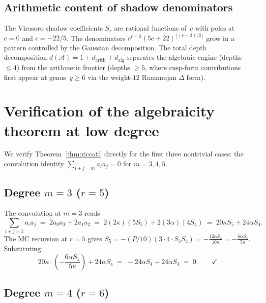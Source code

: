 \documentclass[11pt,reqno]{amsart}
\theoremstyle{definition}
\theoremstyle{remark}
\newcommand{\cA}{\mathcal{A}}
\numberwithin{equation}{section}
\begin{document}
\subsection{Arithmetic content of shadow
denominators}\label{subsec:outlook-arithmetic}

The Virasoro shadow coefficients $S_r$ are rational
functions of~$c$ with poles at $c = 0$ and $c = -22/5$.
The denominators
$c^{r-3}(5c+22)^{\lfloor(r-2)/2\rfloor}$ grow in a
pattern controlled by the Gaussian decomposition.
The total depth decomposition
$d(\cA) = 1 + d_{\mathrm{arith}} + d_{\mathrm{alg}}$
separates the algebraic engine (depths $\le 4$) from the
arithmetic frontier (depths $\ge 5$, where cusp-form
contributions first appear at genus~$g \ge 6$ via the
weight-$12$ Ramanujan $\Delta$ form).



\appendix

\section{Verification of the algebraicity theorem at low
degree}\label{app:verification}

We verify Theorem~\ref{thm:riccati} directly for the first
three nontrivial cases: the convolution identity
$\sum_{i+j=m} a_i a_j = 0$ for $m = 3, 4, 5$.

\subsection{Degree $m = 3$ ($r = 5$)}
\label{subsec:verify-m3}

The convolution at $m = 3$ reads
\[
 \sum_{i+j=3} a_i a_j
 \;=\;
 2a_0 a_3 + 2a_1 a_2
 \;=\;
 2(2\kappa)(5S_5) + 2(3\alpha)(4S_4)
 \;=\;
 20\kappa S_5 + 24\alpha S_4.
\]
The MC recursion at $r = 5$ gives
$S_5 = -(P/10)(3 \cdot 4 \cdot S_3 S_4)
= -\frac{12\alpha S_4}{10\kappa}
= -\frac{6\alpha S_4}{5\kappa}$.
Substituting:
\[
 20\kappa \cdot \left(-\frac{6\alpha S_4}{5\kappa}\right)
 + 24\alpha S_4
 \;=\;
 -24\alpha S_4 + 24\alpha S_4
 \;=\; 0.
 \qquad\checkmark
\]

\subsection{Degree $m = 4$ ($r = 6$)}
\label{subsec:verify-m4}
\end{document}
